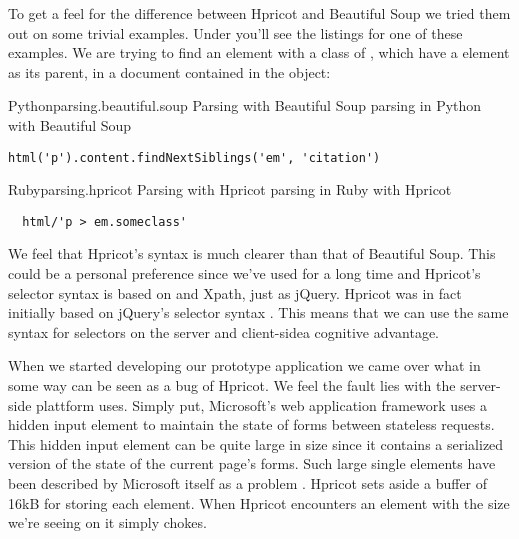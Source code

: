 To get a feel for the difference between Hpricot and Beautiful Soup we tried
them out on some trivial examples. Under you'll see the listings for one
of these examples. We are trying to find an  element with a class
of , which have a  element as its parent,
in a  document contained in the  object:

\begin{scode}{Python}{parsing.beautiful.soup}{%
  Parsing with Beautiful Soup}{%
   parsing in Python with Beautiful Soup}
\begin{lstlisting}
html('p').content.findNextSiblings('em', 'citation')
\end{lstlisting}
\end{scode}

\begin{scode}{Ruby}{parsing.hpricot}{%
  Parsing with Hpricot}{%
   parsing in Ruby with Hpricot}
\begin{lstlisting}
  html/'p > em.someclass'
\end{lstlisting}
\end{scode}

We feel that Hpricot's syntax is much clearer than that of Beautiful Soup.
This could be a personal preference since we've used  for a long
time and Hpricot's selector syntax is based on  and Xpath, just as
jQuery. Hpricot was in fact initially based on jQuery's selector syntax
\citep{why06}. This means that we can use the same syntax for selectors on the
server and client-side\emph{}a cognitive advantage.

When we started developing our prototype application we came over what in
some way can be seen as a bug of Hpricot. We feel the fault lies
with the server-side plattform \urort{} uses. Simply put, Microsoft's
 web application framework uses a hidden 
input element to maintain the state of  forms between
stateless  requests. This hidden input element can be quite large%
in size since it contains a serialized version of the state of the current
page's  forms. Such large single  elements have been
described by Microsoft itself as a problem \citep{mitchell04}.
Hpricot sets aside a buffer of 16kB for storing each  element.
When Hpricot encounters an element with the size we're seeing on \urort{}
it simply chokes.

